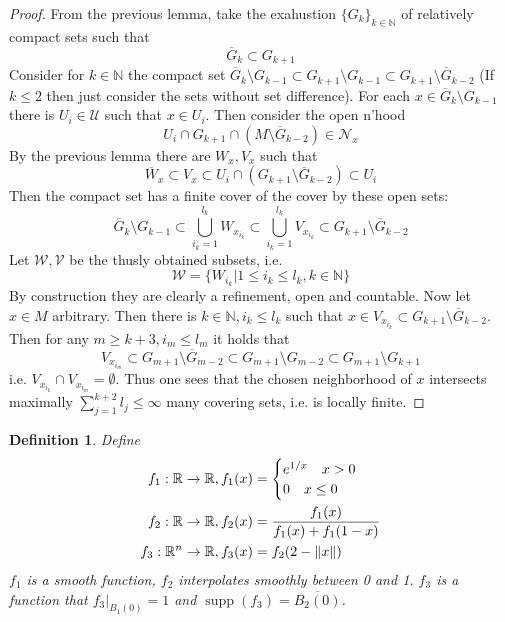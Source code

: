\documentclass{article}
\numberwithin{theorem}{section}
\newtheorem{definition}[theorem]{Definition}
\newcommand{\N}{\mathbb{N}}
\newcommand{\R}{\mathbb{R}}
\newcommand{\1}{\mathds{1}}
\DeclareMathOperator{\supp}{supp}
\begin{document}
\begin{proof}
    From the previous lemma, take the exahustion $\{ G_k \}_{k\in \N}$ of relatively compact sets such that 
    \[ \overline{G}_k \subset G_{k+1} \]  
    Consider for $k \in \N$ the compact set $\overline{G}_k \setminus G_{k-1} \subset G_{k+1} \setminus G_{k-1} \subset G_{k+1} \setminus \overline{G}_{k-2}$ (If $k \leq 2$ then just consider the sets without set difference). For each $x \in \overline{G}_k \setminus G_{k-1}$ there is $U_i \in \mathcal{U}$ such that $x \in U_i$. Then consider the open n'hood 
    \[ U_i \cap G_{k+1} \cap (M\setminus \overline{G}_{k-2}) \in \mathcal{N}_x \]
    By the previous lemma there are $W_x,V_x$ such that 
    \[ \overline{W}_x \subset V_x \subset U_i \cap (G_{k+1}\setminus \overline{G}_{k-2}) \subset U_i \]
    Then the compact set has a finite cover of the cover by these open sets: 
    \[ \overline{G}_k \setminus G_{k-1} \subset \bigcup_{i_k=1}^{l_k} W_{x_{i_k}} \subset \bigcup_{i_k=1}^{l_k} V_{x_{i_k}}\subset G_{k+1} \setminus \overline{G}_{k-2}\]
    Let $\mathcal{W}, \mathcal{V}$ be the thusly obtained subsets, i.e. 
    \[ \mathcal{W} = \{ W_{i_k} | 1 \leq i_k \leq l_k, k \in \N \} \]
     By construction they are clearly a refinement, open and countable. Now let $x \in M$ arbitrary. Then there is $k \in \N, i_k \leq l_k $ such that $x \in V_{x_{i_k}} \subset G_{k+1}\setminus \overline{G}_{k-2}$. Then for any $m \geq k+3, i_m \leq l_m $ it holds that 
     \[ V_{x_{i_m}} \subset G_{m+1}\setminus \overline{G}_{m-2} \subset G_{m+1} \setminus G_{m-2} \subset G_{m+1} \setminus G_{k+1} \]
     i.e. $V_{x_{i_k}} \cap V_{x_{i_m}} = \emptyset $. Thus one sees that the chosen neighborhood of $x$ intersects maximally $\sum_{j=1}^{k+2}l_j  \leq \infty$ many covering sets, i.e. is locally finite. 
\end{proof}

\begin{definition}
    Define 
    \begin{align*}
        f_1: \R \to \R, f_1(x) &= \begin{cases}
            e^{1/x} \quad x >0 \\ 0 \quad x\leq 0 
        \end{cases} \\
        f_2: \R \to \R, f_2(x) &= \frac{f_1(x)}{f_1(x) + f_1(1-x)}\\
        f_3: \R^n \to \R, f_3(x) &= f_2(2-\norm{x})\\
    \end{align*} 
    $f_1$ is a smooth function, $f_2$ interpolates smoothly between 0 and 1. $f_3$ is a function that $f_3|_{B_1(0)} =1$ and $\supp(f_3) = \overline{B_2(0)}$. 
\end{definition}
\end{document}
